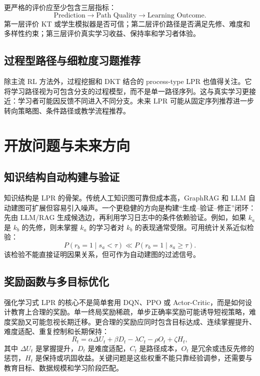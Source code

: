 \documentclass[UTF8,a4paper,zihao=-4]{ctexart}
\begin{document}
更严格的评价应至少包含三层指标：
\begin{equation}
\text{Prediction} \rightarrow \text{Path Quality} \rightarrow \text{Learning Outcome}.
\end{equation}
第一层评价 KT 或学生模拟器是否可信；第二层评价路径是否满足先修、难度和多样性约束；第三层评价真实学习收益、保持率和学习者体验。

\subsection{过程型路径与细粒度习题推荐}

除主流 RL 方法外，过程挖掘和 DKT 结合的 process-type LPR 也值得关注\cite{Zhang2024ProcessDKT}。它将学习路径视为可包含分支的过程模型，而不是单一路径序列。这与真实学习更接近：学习者可能因反馈不同进入不同分支。未来 LPR 可能从固定序列推荐进一步转向策略图、条件路径或教学流程推荐。

\section{开放问题与未来方向}

\subsection{知识结构自动构建与验证}

知识结构是 LPR 的骨架。传统人工知识图可靠但成本高，GraphRAG 和 LLM 自动建图可扩展但容易引入噪声。一个更稳健的方向是构建“生成--验证--修正”闭环：先由 LLM/RAG 生成候选边，再利用学习日志中的条件依赖验证。例如，如果 $k_a$ 是 $k_b$ 的先修，则未掌握 $k_a$ 的学习者对 $k_b$ 的表现通常受限。可用统计关系近似检验：
\begin{equation}
P(r_{b}=1 \mid s_a < \tau) \ll P(r_{b}=1 \mid s_a \ge \tau).
\end{equation}
该检验不能直接证明因果关系，但可作为自动建图的过滤信号。

\subsection{奖励函数与多目标优化}

强化学习式 LPR 的核心不是简单套用 DQN、PPO 或 Actor-Critic，而是如何设计教育上合理的奖励。单一终局奖励稀疏，单步正确率奖励可能诱导短视策略，难度奖励又可能忽视长期迁移。更合理的奖励应同时包含目标达成、连续掌握提升、难度适配、重复控制和长期保持：
\begin{equation}
R_t=
\alpha\Delta U_t+
\beta D_t-
\lambda C_t-
\rho O_t+
\zeta H_t,
\end{equation}
其中 $\Delta U_t$ 是掌握提升，$D_t$ 是难度适配，$C_t$ 是路径成本，$O_t$ 是冗余或违反先修的惩罚，$H_t$ 是保持或巩固收益。关键问题是这些权重不能只靠经验调参，还需要与教育目标、数据规模和学习阶段匹配。
\end{document}
